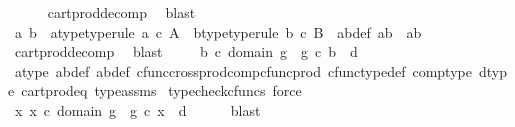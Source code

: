 \begin{isabellebody}
\ \ \ \ \isamarkupfalse%
\ cart{\isacharunderscore}{\kern0pt}prod{\isacharunderscore}{\kern0pt}decomp\ \isamarkupfalse%
\ blast\isanewline
\ \ \isamarkupfalse%
\ \isamarkupfalse%
\ a\ b\ \ a{\isacharunderscore}{\kern0pt}type{\isacharbrackleft}{\kern0pt}type{\isacharunderscore}{\kern0pt}rule{\isacharbrackright}{\kern0pt}{\isacharcolon}{\kern0pt}\ {\isachardoublequoteopen}a\ {\isasymin}\isactrlsub c\ A{\isachardoublequoteclose}\ \ b{\isacharunderscore}{\kern0pt}type{\isacharbrackleft}{\kern0pt}type{\isacharunderscore}{\kern0pt}rule{\isacharbrackright}{\kern0pt}{\isacharcolon}{\kern0pt}\ {\isachardoublequoteopen}b\ {\isasymin}\isactrlsub c\ B{\isachardoublequoteclose}\ \ ab{\isacharunderscore}{\kern0pt}def{}{\isacharcolon}{\kern0pt}\ {\isachardoublequoteopen}ab\ {\isacharequal}{\kern0pt}\ {\isasymlangle}a{\isacharcomma}{\kern0pt}b{\isasymrangle}{\isachardoublequoteclose}\isanewline
\ \ \ \ \isamarkupfalse%
\ cart{\isacharunderscore}{\kern0pt}prod{\isacharunderscore}{\kern0pt}decomp\ \isamarkupfalse%
\ blast\isanewline
\ \ \isamarkupfalse%
\ \ {\isachardoublequoteopen}b\ {\isasymin}\isactrlsub c\ domain\ g\ {\isasymand}\ g\ {\isasymcirc}\isactrlsub c\ b\ {\isacharequal}{\kern0pt}\ d{\isachardoublequoteclose}\isanewline
\ \ \ \ \isamarkupfalse%
\ a{\isacharunderscore}{\kern0pt}type\ ab{\isacharunderscore}{\kern0pt}def\ ab{\isacharunderscore}{\kern0pt}def{}\ cfunc{\isacharunderscore}{\kern0pt}cross{\isacharunderscore}{\kern0pt}prod{\isacharunderscore}{\kern0pt}comp{\isacharunderscore}{\kern0pt}cfunc{\isacharunderscore}{\kern0pt}prod\ cfunc{\isacharunderscore}{\kern0pt}type{\isacharunderscore}{\kern0pt}def\ comp{\isacharunderscore}{\kern0pt}type\ d{\isacharunderscore}{\kern0pt}type\ cart{\isacharunderscore}{\kern0pt}prod{\isacharunderscore}{\kern0pt}eq{}\ type{\isacharunderscore}{\kern0pt}assms\ \isamarkupfalse%
{\isacharparenleft}{\kern0pt}typecheck{\isacharunderscore}{\kern0pt}cfuncs{\isacharcomma}{\kern0pt}\ force{\isacharparenright}{\kern0pt}\isanewline
\ \ \isamarkupfalse%
\ \isamarkupfalse%
\ {\isachardoublequoteopen}{\isasymexists}x{\isachardot}{\kern0pt}\ x\ {\isasymin}\isactrlsub c\ domain\ g\ {\isasymand}\ g\ {\isasymcirc}\isactrlsub c\ x\ {\isacharequal}{\kern0pt}\ d{\isachardoublequoteclose}\isanewline
\ \ \ \ \isamarkupfalse%
\ blast\isanewline
{}\isamarkupfalse%

\end{isabellebody}
